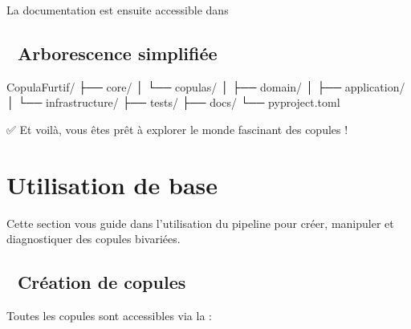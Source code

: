 \documentclass[letterpaper,18pt,english]{sphinxhowto}
\begin{document}
\sphinxAtStartPar
La documentation est ensuite accessible dans 


\subsection{📂 Arborescence simplifiée}
\label{\detokenize{pages/installation:arborescence-simplifiee}}
\begin{sphinxVerbatim}[commandchars=\\\{\}]
CopulaFurtif/
├── core/
│   └── copulas/
│       ├── domain/
│       ├── application/
│       └── infrastructure/
├── tests/
├── docs/
└── pyproject.toml
\end{sphinxVerbatim}

\sphinxAtStartPar
✅ Et voilà, vous êtes prêt à explorer le monde fascinant des copules !

\sphinxstepscope


\section{Utilisation de base}
\label{\detokenize{pages/usage:utilisation-de-base}}\label{\detokenize{pages/usage:usage}}\label{\detokenize{pages/usage::doc}}
\sphinxAtStartPar
Cette section vous guide dans l’utilisation du pipeline  pour créer, manipuler et diagnostiquer des copules bivariées.


\subsection{🧱 Création de copules}
\label{\detokenize{pages/usage:creation-de-copules}}
\sphinxAtStartPar
Toutes les copules sont accessibles via la  :

\begin{sphinxVerbatim}[commandchars=\\\{\}]
 

  
  
\end{sphinxVerbatim}
\end{document}
